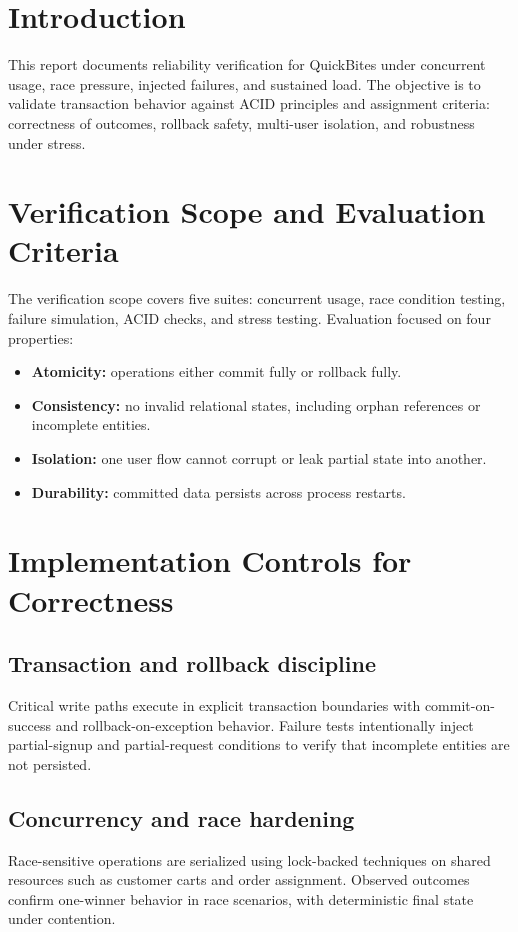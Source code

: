 \documentclass[a4paper, 11pt]{article}
\begin{document}
\section{Introduction}
This report documents reliability verification for QuickBites under concurrent usage, race pressure, injected failures, and sustained load. The objective is to validate transaction behavior against ACID principles and assignment criteria: correctness of outcomes, rollback safety, multi-user isolation, and robustness under stress.

\section{Verification Scope and Evaluation Criteria}
The verification scope covers five suites: concurrent usage, race condition testing, failure simulation, ACID checks, and stress testing. Evaluation focused on four properties:
\begin{itemize}
    \item \textbf{Atomicity:} operations either commit fully or rollback fully.
    \item \textbf{Consistency:} no invalid relational states, including orphan references or incomplete entities.
    \item \textbf{Isolation:} one user flow cannot corrupt or leak partial state into another.
    \item \textbf{Durability:} committed data persists across process restarts.
\end{itemize}

\section{Implementation Controls for Correctness}

\subsection{Transaction and rollback discipline}
Critical write paths execute in explicit transaction boundaries with commit-on-success and rollback-on-exception behavior. Failure tests intentionally inject partial-signup and partial-request conditions to verify that incomplete entities are not persisted.

\subsection{Concurrency and race hardening}
Race-sensitive operations are serialized using lock-backed techniques on shared resources such as customer carts and order assignment. Observed outcomes confirm one-winner behavior in race scenarios, with deterministic final state under contention.
\end{document}
